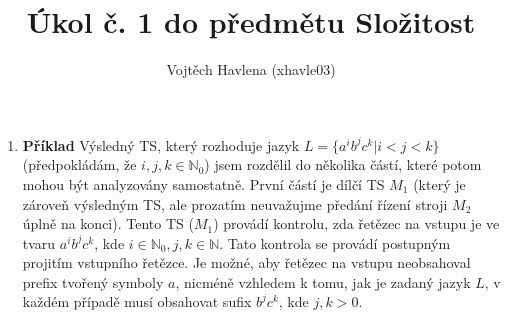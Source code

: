 \documentclass[a4paper,12pt]{article}
\title{Úkol č. 1 do předmětu Složitost}
\author{Vojtěch Havlena (xhavle03)}
\date{}
\begin{document}
\maketitle


\begin{enumerate}[label=\textbf{\arabic*}.]

 \item {\bfseries Příklad}
 Výsledný TS, který rozhoduje jazyk $L = \{a^ib^jc^k | i < j < k\}$ (předpokládám, že $i,j,k \in\mathbb{N}_0$) jsem rozdělil do několika
 částí, které potom mohou být analyzovány samostatně. První částí je dílčí TS $M_1$ (který je zároveň výsledným TS, ale prozatím neuvažujme
 předání řízení stroji $M_2$ úplně na konci). Tento TS ($M_1$) provádí kontrolu, zda řetězec na vstupu je ve tvaru $a^ib^jc^k$, kde 
 $i \in \mathbb{N}_0, j, k \in \mathbb{N}$. Tato kontrola se provádí postupným projitím vstupního řetězce. Je možné, aby řetězec na 
 vstupu neobsahoval prefix tvořený symboly $a$, nicméně vzhledem k tomu,
 jak je zadaný jazyk $L$, v každém případě musí obsahovat sufix $b^jc^k$, kde $j, k > 0$.
 \begin{center}
\end{center}
\end{enumerate}
\end{document}
